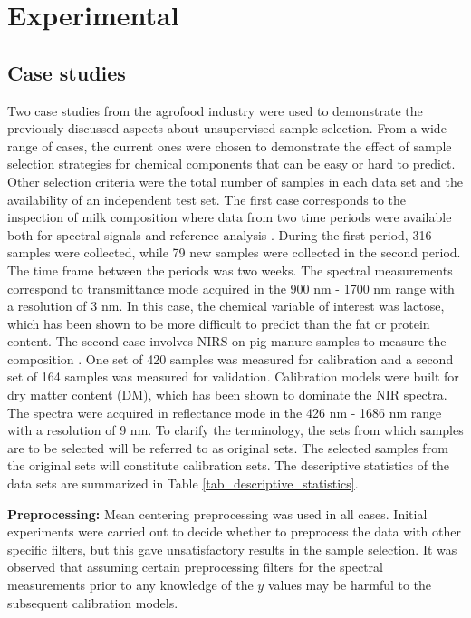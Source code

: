 \documentclass[journal=ancham,manuscript=article]{achemso}
\begin{document}

\section{Experimental}\label{experimental}

\subsection{Case studies}\label{data}

Two case studies from the agrofood industry were used to demonstrate the previously discussed aspects about unsupervised sample selection. From a wide range of cases, the current ones were chosen to demonstrate the effect of sample selection strategies for chemical components that can be easy or hard to predict. Other selection criteria were the total number of samples in each data set and the availability of an independent test set. The first case corresponds to the inspection of milk composition where data from two time periods were available both for spectral signals and reference analysis \cite{Diaz-Olivares2020}. During the first period, 316 samples were collected, while 79 new samples were collected in the second period. The time frame between the periods was two weeks. The spectral measurements correspond to transmittance mode acquired in the 900 nm - 1700 nm range with a resolution of 3 nm. In this case, the chemical variable of interest was lactose, which has been shown to be more difficult to predict than the fat or protein content.
The second case involves NIRS on pig manure samples to measure the composition \cite{Saeys2005}. One set of 420 samples was measured for calibration and a second set of 164 samples was measured for validation. Calibration models were built for dry matter content (DM), which has been shown to dominate the NIR spectra. The spectra were acquired in reflectance mode in the 426 nm - 1686 nm range with a resolution of 9 nm. To clarify the terminology, the sets from which samples are to be selected will be referred to as original sets. The selected samples from the original sets will constitute calibration sets. The descriptive statistics of the data sets are summarized in Table \ref{tab_descriptive_statistics}.

\textbf{Preprocessing:} Mean centering preprocessing was used in all cases. Initial experiments were carried out to decide whether to preprocess the data with other specific filters, but this gave unsatisfactory results in the sample selection. It was observed that assuming certain preprocessing filters for the spectral measurements prior to any knowledge of the $y$ values may be harmful to the subsequent calibration models. 
\end{document}
